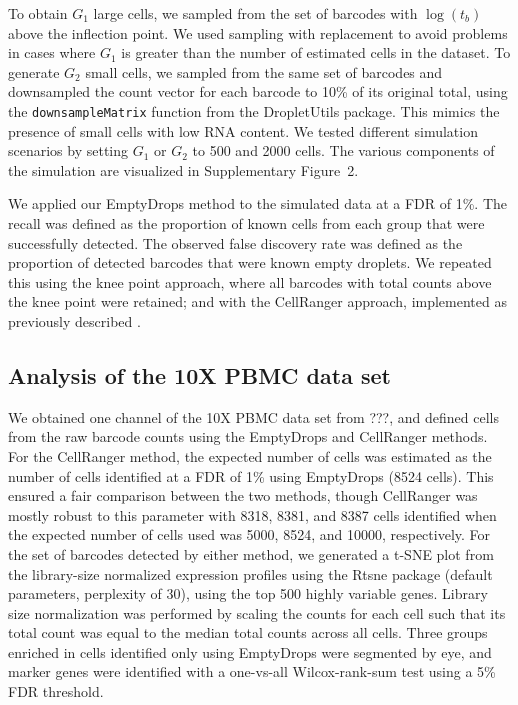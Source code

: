 \documentclass[10pt,letterpaper]{article}
\newcommand{\code}[1]{\texttt{#1}}
\newcommand{\suppfigsimdesign}{2}
\begin{document}
To obtain $G_1$ large cells, we sampled from the set of barcodes with $\log(t_b)$ above the inflection point.
We used sampling with replacement to avoid problems in cases where $G_1$ is greater than the number of estimated cells in the dataset.
To generate $G_2$ small cells, we sampled from the same set of barcodes and downsampled the count vector for each barcode to 10\% of its original total,
using the \code{downsampleMatrix} function from the \textsf{DropletUtils} package.
This mimics the presence of small cells with low RNA content. 
We tested different simulation scenarios by setting $G_1$ or $G_2$ to 500 and 2000 cells.
The various components of the simulation are visualized in Supplementary Figure~\suppfigsimdesign{}.

We applied our EmptyDrops method to the simulated data at a FDR of 1\%. 
The recall was defined as the proportion of known cells from each group that were successfully detected.
The observed false discovery rate was defined as the proportion of detected barcodes that were known empty droplets.
We repeated this using the knee point approach, where all barcodes with total counts above the knee point were retained;
and with the CellRanger approach, implemented as previously described \cite{zheng2017massively}.

\subsection*{Analysis of the 10X PBMC data set}
We obtained one channel of the 10X PBMC data set from ???, and defined cells from the raw barcode counts using the EmptyDrops and CellRanger methods. 
For the CellRanger method, the expected number of cells was estimated as the number of cells identified at a FDR of 1\% using EmptyDrops (8524 cells).
This ensured a fair comparison between the two methods, though CellRanger was mostly robust to this parameter with 8318, 8381, and 8387 cells identified when the expected number of cells used was 5000, 8524, and 10000, respectively. 
For the set of barcodes detected by either method, we generated a t-SNE plot from the library-size normalized expression profiles using the Rtsne package (default parameters, perplexity of 30), using the top 500 highly variable genes. 
Library size normalization was performed by scaling the counts for each cell such that its total count was equal to the median total counts across all cells. 
Three groups enriched in cells identified only using EmptyDrops were segmented by eye, and marker genes were identified with a one-vs-all Wilcox-rank-sum test using a 5\% FDR threshold.



\end{document}
